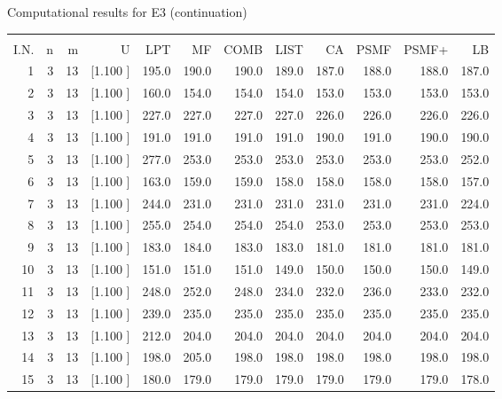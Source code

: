 \documentclass[12pt,a4paper]{article}
\begin{document}
\newpage
\begin{center}
 Computational results for E3 (continuation) {\tiny
\begin{tabular}{r r r r r r r r r r r r}\hline
    &   &   &          &        &        &        &        &        &        &        &       \\[-0.1in]
  I.N.  &  n  &  m  &  U  &  LPT  &  MF  &  COMB  &  LIST  &  CA  & PSMF &PSMF+ & LB \\[0.03in]
\hline
   1&  3& 13&[1.100     ]&   195.0&   190.0&   190.0&   189.0&   187.0&   188.0&   188.0&   187.0\\[-0.02in]
   2&  3& 13&[1.100     ]&   160.0&   154.0&   154.0&   154.0&   153.0&   153.0&   153.0&   153.0\\[-0.02in]
   3&  3& 13&[1.100     ]&   227.0&   227.0&   227.0&   227.0&   226.0&   226.0&   226.0&   226.0\\[-0.02in]
   4&  3& 13&[1.100     ]&   191.0&   191.0&   191.0&   191.0&   190.0&   191.0&   190.0&   190.0\\[-0.02in]
   5&  3& 13&[1.100     ]&   277.0&   253.0&   253.0&   253.0&   253.0&   253.0&   253.0&   252.0\\[-0.02in]
   6&  3& 13&[1.100     ]&   163.0&   159.0&   159.0&   158.0&   158.0&   158.0&   158.0&   157.0\\[-0.02in]
   7&  3& 13&[1.100     ]&   244.0&   231.0&   231.0&   231.0&   231.0&   231.0&   231.0&   224.0\\[-0.02in]
   8&  3& 13&[1.100     ]&   255.0&   254.0&   254.0&   254.0&   253.0&   253.0&   253.0&   253.0\\[-0.02in]
   9&  3& 13&[1.100     ]&   183.0&   184.0&   183.0&   183.0&   181.0&   181.0&   181.0&   181.0\\[-0.02in]
  10&  3& 13&[1.100     ]&   151.0&   151.0&   151.0&   149.0&   150.0&   150.0&   150.0&   149.0\\[-0.02in]
  11&  3& 13&[1.100     ]&   248.0&   252.0&   248.0&   234.0&   232.0&   236.0&   233.0&   232.0\\[-0.02in]
  12&  3& 13&[1.100     ]&   239.0&   235.0&   235.0&   235.0&   235.0&   235.0&   235.0&   235.0\\[-0.02in]
  13&  3& 13&[1.100     ]&   212.0&   204.0&   204.0&   204.0&   204.0&   204.0&   204.0&   204.0\\[-0.02in]
  14&  3& 13&[1.100     ]&   198.0&   205.0&   198.0&   198.0&   198.0&   198.0&   198.0&   198.0\\[-0.02in]
  15&  3& 13&[1.100     ]&   180.0&   179.0&   179.0&   179.0&   179.0&   179.0&   179.0&   178.0\\[-0.02in]

\end{tabular}}
\end{center}
\end{document}
